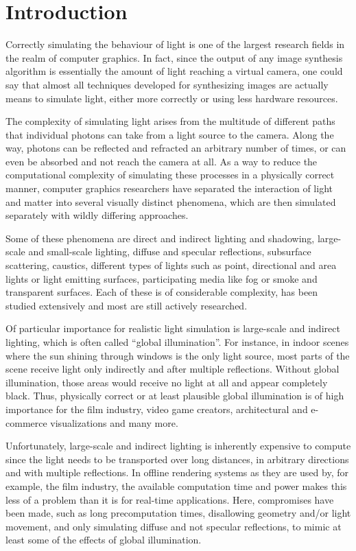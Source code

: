 
\chapter{Introduction}
\label{chap:introduction}

Correctly simulating the behaviour of light is one of the largest research fields in the realm of computer graphics. In fact, since the output of any image synthesis algorithm is essentially the amount of light reaching a virtual camera, one could say that almost all techniques developed for synthesizing images are actually means to simulate light, either more correctly or using less hardware resources.

The complexity of simulating light arises from the multitude of different paths that individual photons can take from a light source to the camera. Along the way, photons can be reflected and refracted an arbitrary number of times, or can even be absorbed and not reach the camera at all. As a way to reduce the computational complexity of simulating these processes in a physically correct manner, computer graphics researchers have separated the interaction of light and matter into several visually distinct phenomena, which are then simulated separately with wildly differing approaches.

Some of these phenomena are direct and indirect lighting and shadowing, large-scale and small-scale lighting, diffuse and specular reflections, subsurface scattering, caustics, different types of lights such as point, directional and area lights or light emitting surfaces, participating media like fog or smoke and transparent surfaces. Each of these is of considerable complexity, has been studied extensively and most are still actively researched.

Of particular importance for realistic light simulation is large-scale and indirect lighting, which is often called ``global illumination''. For instance, in indoor scenes where the sun shining through windows is the only light source, most parts of the scene receive light only indirectly and after multiple reflections. Without global illumination, those areas would receive no light at all and appear completely black. Thus, physically correct or at least plausible global illumination is of high importance for the film industry, video game creators, architectural and e-commerce visualizations and many more.

Unfortunately, large-scale and indirect lighting is inherently expensive to compute since the light needs to be transported over long distances, in arbitrary directions and with multiple reflections. In offline rendering systems as they are used by, for example, the film industry, the available computation time and power makes this less of a problem than it is for real-time applications. Here, compromises have been made, such as long precomputation times, disallowing geometry and/or light movement, and only simulating diffuse and not specular reflections, to mimic at least some of the effects of global illumination.

